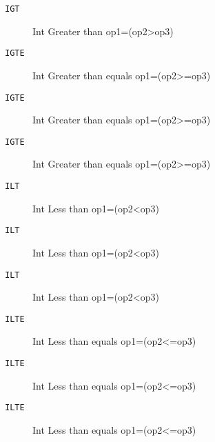 
\begin{description}
\item[\texttt{IGT        }]  Int Greater than op1=(op2>op3)\\
\end{description}

\begin{description}
\item[\texttt{IGTE       }]  Int Greater than equals op1=(op2>=op3)\\
\end{description}

\begin{description}
\item[\texttt{IGTE       }]  Int Greater than equals op1=(op2>=op3)\\
\end{description}

\begin{description}
\item[\texttt{IGTE       }]  Int Greater than equals op1=(op2>=op3)\\
\end{description}

\begin{description}
\item[\texttt{ILT        }]  Int Less than op1=(op2<op3)\\
\end{description}

\begin{description}
\item[\texttt{ILT        }]  Int Less than op1=(op2<op3)\\
\end{description}

\begin{description}
\item[\texttt{ILT        }]  Int Less than op1=(op2<op3)\\
\end{description}

\begin{description}
\item[\texttt{ILTE       }]  Int Less than equals op1=(op2<=op3)\\
\end{description}

\begin{description}
\item[\texttt{ILTE       }]  Int Less than equals op1=(op2<=op3)\\
\end{description}

\begin{description}
\item[\texttt{ILTE       }]  Int Less than equals op1=(op2<=op3)\\
\end{description}
